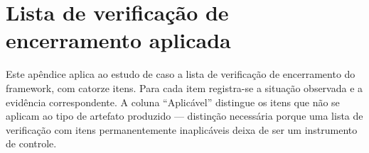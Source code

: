 
\chapter{Lista de verificação de encerramento aplicada}
\label{ap:checklist}

Este apêndice aplica ao estudo de caso a lista de verificação de encerramento do
framework, com catorze itens. Para cada item registra-se a situação observada e a
evidência correspondente. A coluna ``Aplicável'' distingue os itens que não se
aplicam ao tipo de artefato produzido --- distinção necessária porque uma lista de
verificação com itens permanentemente inaplicáveis deixa de ser um instrumento de
controle.

